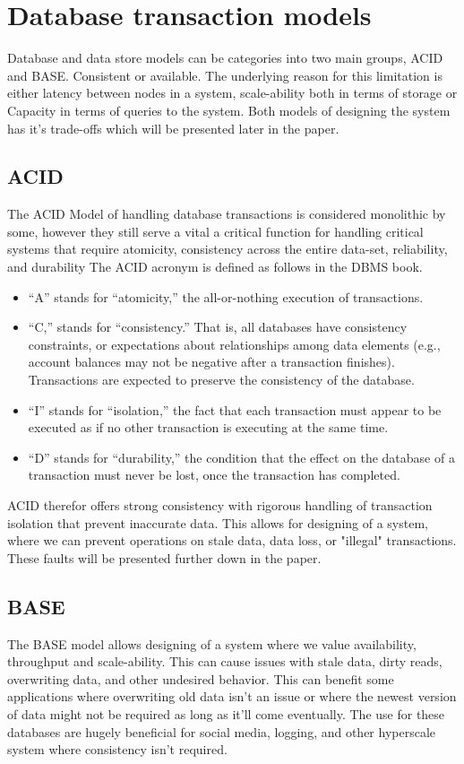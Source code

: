 \documentclass[a4paper,10pt,titlepage]{report}
\begin{document}
\section{Database transaction models}

Database and data store models can be categories into two main groups, ACID and BASE. Consistent or available. The underlying reason for this limitation is either latency between nodes in a system, scale-ability both in terms of storage or Capacity in terms of queries to the system. Both models of designing the system has it's trade-offs which will be presented later in the paper.
\subsection{ACID}

The ACID Model of handling database transactions is considered monolithic by some, however they still serve a vital a critical function for handling critical systems that require atomicity, consistency across the entire data-set, reliability, and durability
The ACID acronym is defined as follows in the DBMS book\cite{DBMSbook}.

\begin{itemize}
    \item “A” stands for “atomicity,” the all-or-nothing execution of transactions.
    \item “C,” stands for “consistency.” That is, all databases
have consistency constraints, or expectations about relationships among
data elements (e.g., account balances may not be negative after a transaction finishes). Transactions are expected to preserve the consistency of
the database.
\item “I” stands for “isolation,” the fact that each transaction must appear
to be executed as if no other transaction is executing at the same
time.
\item “D” stands for “durability,” the condition that the effect on the
database of a transaction must never be lost, once the transaction
has completed.
\end{itemize}

ACID therefor offers strong consistency with rigorous handling of transaction isolation that prevent inaccurate data. This allows for designing of a system, where we can prevent operations on stale data, data loss, or "illegal" transactions. These faults will be presented further down in the paper.


\subsection{BASE}
The BASE model allows designing of a system where we value availability, throughput and scale-ability. This can cause issues with stale data, dirty reads, overwriting data, and other undesired behavior. This can benefit some applications where overwriting old data isn't an issue or where the newest version of data might not be required as long as it'll come eventually. The use for these databases are hugely beneficial for social media, logging, and other hyperscale system where consistency isn't required.\\
\end{document}
